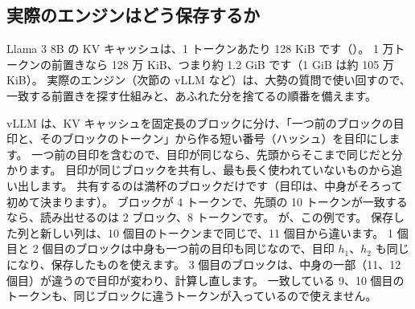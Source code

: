 \subsection*{実際のエンジンはどう保存するか}

Llama 3 8B の KV キャッシュは、1 トークンあたり 128 KiB です（）。
1 万トークンの前置きなら 128 万 KiB、つまり約 1.2 GiB です（1 GiB は約 105 万 KiB）。
実際のエンジン（次節の vLLM など）は、大勢の質問で使い回すので、一致する前置きを探す仕組みと、あふれた分を捨てるの順番を備えます。

vLLM は、KV キャッシュを固定長のブロックに分け\cite{kwon2023efficient}、「一つ前のブロックの目印と、そのブロックのトークン」から作る短い番号（ハッシュ）を目印にします\cite{vllm2026apc}。
一つ前の目印を含むので、目印が同じなら、先頭からそこまで同じだと分かります。
目印が同じブロックを共有し、最も長く使われていないものから追い出します。
共有するのは満杯のブロックだけです（目印は、中身がそろって初めて決まります）。
ブロックが 4 トークンで、先頭の 10 トークンが一致するなら、読み出せるのは 2 ブロック、8 トークンです。
が、この例です。
保存した列と新しい列は、10 個目のトークンまで同じで、11 個目から違います。
1 個目と 2 個目のブロックは中身も一つ前の目印も同じなので、目印 $h_1$、$h_2$ も同じになり、保存したものを使えます。
3 個目のブロックは、中身の一部（11、12 個目）が違うので目印が変わり、計算し直します。
一致している 9、10 個目のトークンも、同じブロックに違うトークンが入っているので使えません。

